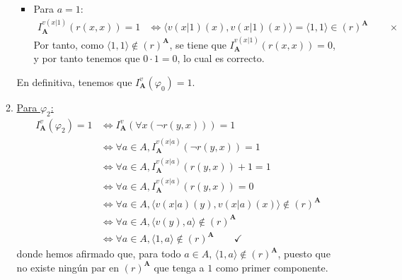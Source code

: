 \documentclass[12pt]{article}
\renewcommand{\bf}[1]{\mathbf{#1}}
\begin{document}
\begin{ejercicio}
\begin{enumerate}
\begin{enumerate}
\begin{itemize}
                    \item Para $a=1$:
                    \begin{align*}
                        I_{\bf{A}}^{v(x|1)}(r(x, x)) = 1 & \Longleftrightarrow \langle v(x|1)(x),v(x|1)(x)\rangle = \langle 1,1\rangle\in (r)^{\bf{A}} \qquad \times
                    \end{align*}
                    Por tanto, como $\langle 1,1\rangle\notin (r)^{\bf{A}}$, se tiene que $I_{\bf{A}}^{v(x|1)}(r(x, x))=0$, y por tanto tenemos que $0\cdot 1 = 0$, lo cual es correcto.
                \end{itemize}
                En definitiva, tenemos que $I_{\bf{A}}^v(\varphi_0)=1$.
    
                \item \underline{Para $\varphi_2$:}
                \begin{align*}
                    I_{\bf{A}}^v(\varphi_2) = 1 & \Longleftrightarrow I_{\bf{A}}^v(\forall x (\lnot r(y, x)))=1\\
                    & \Longleftrightarrow \forall a\in A, I_{\bf{A}}^{v(x|a)}(\lnot r(y, x))=1\\
                    & \Longleftrightarrow \forall a\in A, I_{\bf{A}}^{v(x|a)}(r(y, x))+1=1\\
                    & \Longleftrightarrow \forall a\in A, I_{\bf{A}}^{v(x|a)}(r(y, x))=0 \\
                    & \Longleftrightarrow \forall a\in A, \langle v(x|a)(y),v(x|a)(x)\rangle\notin (r)^{\bf{A}}\\
                    & \Longleftrightarrow \forall a\in A, \langle v(y),a\rangle\notin (r)^{\bf{A}} \\
                    & \Longleftrightarrow \forall a\in A, \langle 1,a\rangle\notin (r)^{\bf{A}} \qquad \checkmark
                \end{align*}
                donde hemos afirmado que, para todo $a\in A$, $\langle 1,a\rangle\notin (r)^{\bf{A}}$, puesto que no existe ningún par en $(r)^{\bf{A}}$ que tenga a $1$ como primer componente.
    

\end{enumerate}
\end{enumerate}
\end{ejercicio}
\end{document}
